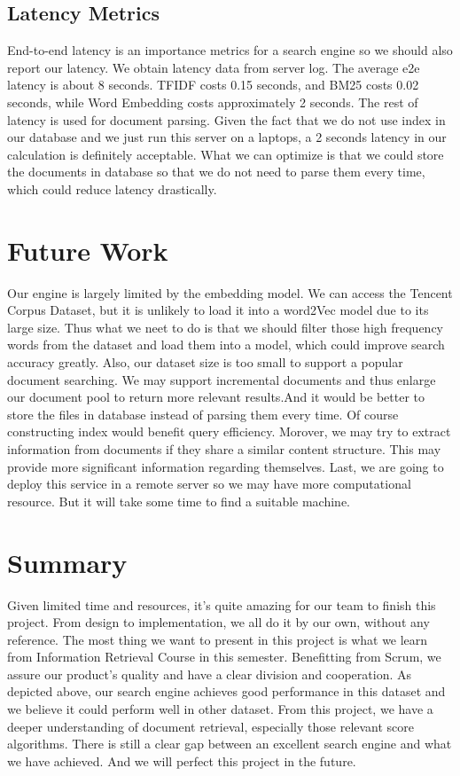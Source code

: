 \documentclass[UTF8]{article}
\begin{document}
	\subsection{Latency Metrics}
	 End-to-end latency is an importance metrics for a search engine so we should also report our latency. We obtain latency data from server log. The average e2e latency is about 8 seconds. TFIDF costs 0.15 seconds, and BM25 costs 0.02 seconds, while Word Embedding costs approximately 2 seconds. The rest of latency is used for document parsing.
   Given the fact that we do not use index in our database and we just run this server on a laptops, a 2 seconds latency in our calculation is definitely acceptable. What we can optimize is that we could store the documents in database so that we do not need to parse them every time, which could reduce latency drastically.
	
	\section{Future Work}
	Our engine is largely limited by the embedding model. We can access the Tencent Corpus Dataset, but it is unlikely to load it into a word2Vec model due to its large size. Thus what we neet to do is that we should filter those high frequency words from the dataset and load them into a model, which could improve search accuracy greatly.
	Also, our dataset size is too small to support a popular document searching. We may support incremental documents and thus enlarge our document pool to return more relevant results.And it would be better to store the files in database instead of parsing them every time. Of course constructing index would benefit query efficiency.
	Morover, we may try to extract information from documents if they share a similar content structure. This may provide more significant information regarding themselves.
	Last, we are going to deploy this service in a remote server so we may have more computational resource. But it will take some time to find a suitable machine.
	
	\section{Summary}
	Given limited time and resources, it's quite amazing for our team to finish this project. From design to implementation, we all do it by our own, without any reference. The most thing we want to present in this project is what we learn from Information Retrieval Course in this semester. Benefitting from Scrum, we assure our product's quality and have a clear division and cooperation. As depicted above, our search engine achieves good performance in this dataset and we believe it could perform well in other dataset.
	From this project, we have a deeper understanding of document retrieval, especially those relevant score algorithms. There is still a clear gap between an excellent search engine and what we have achieved. And we will perfect this project in the future.
\end{document}
